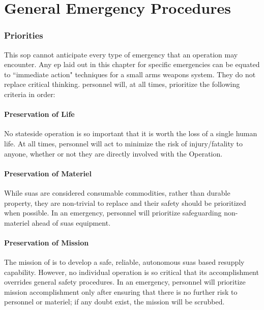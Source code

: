       \section{General Emergency Procedures}\label{sec:ep-general}
    
            \subsubsection{Priorities} This \ac{sop} cannot anticipate every type of emergency that an operation may encounter. Any \acf{ep} laid out in this chapter for specific emergencies can be equated to ``immediate action" techniques for a small arms weapons system. They do not replace critical thinking. \projectmars{} personnel will, at all times, prioritize the following criteria in order:
            
                \paragraph{Preservation of Life} No stateside operation is so important that it is worth the loss of a single human life. At all times, \projectmars{} personnel will act to minimize the risk of injury/fatality to anyone, whether or not they are directly involved with the Operation.
                 
                \paragraph{Preservation of Materiel} While \ac{suas} are considered consumable commodities, rather than durable property, they are non-trivial to replace and their safety should be prioritized when possible. In an emergency, \projectmars{} personnel will prioritize safeguarding non-\projectmars{} materiel ahead of \ac{suas} equipment.
                 
                \paragraph{Preservation of Mission} The mission of \projectmars{} is to develop a safe, reliable, autonomous \ac{suas} based resupply capability. However, no individual operation is so critical that its accomplishment overrides general safety procedures. In an emergency, \projectmars{} personnel will prioritize mission accomplishment only after ensuring that there is no further risk to personnel or materiel; if any doubt exist, the mission will be scrubbed.
    
